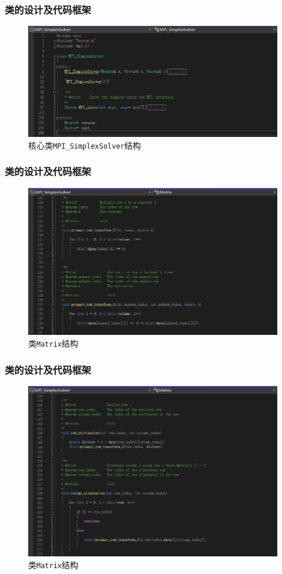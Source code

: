 \documentclass{beamer}
\begin{document}
\begin{frame}
    \frametitle{类的设计及代码框架}
    \begin{figure}[H]
        \centering
        \includegraphics[width=1\linewidth]{MPI_SimplexSolver.png}
        \caption{核心类\texttt{MPI\_SimplexSolver}结构}
    \end{figure}
\end{frame}

\begin{frame}
    \frametitle{类的设计及代码框架}
    \begin{figure}[H]
        \centering
        \includegraphics[width=1\linewidth]{Matrix1.png}
        \caption{类\texttt{Matrix}结构}
    \end{figure}
\end{frame}

\begin{frame}
    \frametitle{类的设计及代码框架}
    \begin{figure}[H]
        \centering
        \includegraphics[width=1\linewidth]{Matrix2.png}
        \caption{类\texttt{Matrix}结构}
    \end{figure}
\end{frame}
\end{document}
